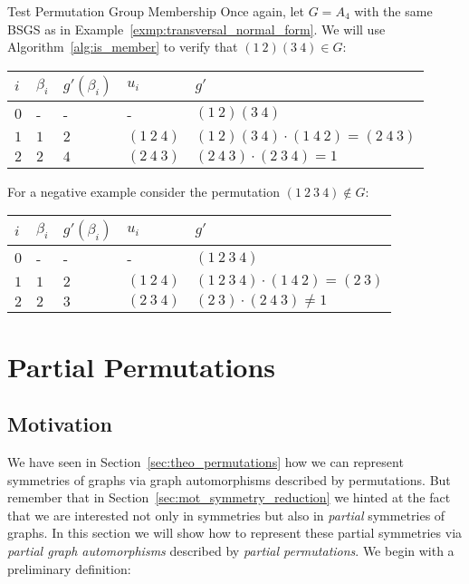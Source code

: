 \begin{exmp}{Test Permutation Group Membership}
  Once again, let $G = A_4$ with the same BSGS as in
  Example~\ref{exmp:transversal_normal_form}. We will use
  Algorithm~\ref{alg:is_member} to verify that $(1\ 2)(3\ 4) \in G$:
  \begin{center}
    \begin{tabular}{l|l|l|l|l}
      \toprule
      $i$ & $\beta_i$ & $g'(\beta_i)$ & $u_i$ & $g'$ \\
      \midrule
      $0$ & -   & -   & -            & $(1\ 2)(3\ 4)$                             \\
      $1$ & $1$ & $2$ & $(1\ 2\ 4)$  & $(1\ 2)(3\ 4) \cdot (1\ 4\ 2) = (2\ 4\ 3)$ \\
      $2$ & $2$ & $4$ & $(2\ 4\ 3)$  & $(2\ 4\ 3) \cdot (2\ 3\ 4) = 1$            \\
      \bottomrule
    \end{tabular}
  \end{center}
  For a negative example consider the permutation $(1\ 2\ 3\ 4) \notin G$:
  \begin{center}
    \begin{tabular}{l|l|l|l|l}
      \toprule
      $i$ & $\beta_i$ & $g'(\beta_i)$ & $u_i$ & $g'$ \\
      \midrule
      $0$ & -   & -   & -            & $(1\ 2\ 3\ 4)$                          \\
      $1$ & $1$ & $2$ & $(1\ 2\ 4)$  & $(1\ 2\ 3\ 4) \cdot (1\ 4\ 2) = (2\ 3)$ \\
      $2$ & $2$ & $3$ & $(2\ 3\ 4)$  & $(2\ 3) \cdot (2\ 4\ 3) \ne 1$          \\
      \bottomrule
    \end{tabular}
  \end{center}
\end{exmp}

\section{Partial Permutations}
\label{sec:theo_partial_permutations}

\subsection{Motivation}

We have seen in Section~\ref{sec:theo_permutations} how we can represent
symmetries of graphs via graph automorphisms described by permutations. But
remember that in Section~\ref{sec:mot_symmetry_reduction} we hinted at the fact
that we are interested not only in symmetries but also in \textit{partial}
symmetries of graphs. In this section we will show how to represent these
partial symmetries via \textit{partial graph automorphisms} described by
\textit{partial permutations}. We begin with a preliminary definition:

